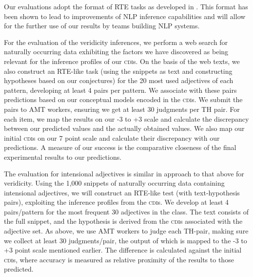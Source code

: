 \documentclass[10pt]{article}
\begin{document}
\vspace {-3mm}

Our evaluations adopt the format of RTE tasks as developed in \cite{pascal}. This format has been shown to lead to improvements of NLP inference capabilities and will allow for the further use of our results by teams building NLP systems. 



For the evaluation of the veridicity inferences, we perform  a web search for naturally occurring data exhibiting the factors we have discovered as being relevant for the inference profiles of our \textsc{cdi}s. On the basis of the web texts, we also construct an RTE-like task (using the snippets as {\sc text} and constructing {\sc hypotheses} based on our conjectures) for the 20 most used adjectives of each pattern, developing at least 4 pairs per pattern. We associate with these pairs predictions based on our conceptual models encoded in the \textsc{cdi}s. We submit the pairs to AMT workers, ensuring we get at least 30 judgments per TH pair. For each item, we map the results on our -3 to +3 scale and calculate the discrepancy between our predicted values and the actually obtained values. We also map our initial \textsc{cdi}s on our 7 point scale and calculate their discrepancy with our predictions. A measure of our success is the comparative closeness of the final experimental results to our predictions. 


The evaluation for intensional adjectives is similar in approach to that above for  veridicity. 
Using the 1,000 snippets of naturally occurring data containing intensional adjectives, we will construct an RTE-like test (with {\sc text}-{\sc hypothesis} pairs), exploiting the inference profiles from the \textsc{cdi}s. We develop at least 4 pairs/pattern for the most frequent 30 adjectives in the class. 
The  {\sc text} consists of the full snippet, and the {\sc hypothesis} is derived from the \textsc{cdi}s associated with the adjective set. 
As above, we use AMT workers to judge each TH-pair, making sure we
collect at least 30 judgments/pair, the output of which is mapped to
the -3 to +3 point scale mentioned earlier. The difference is
calculated against the initial \textsc{cdi}s, where accuracy is measured
as relative proximity of the results  to those predicted. 
\end{document}
